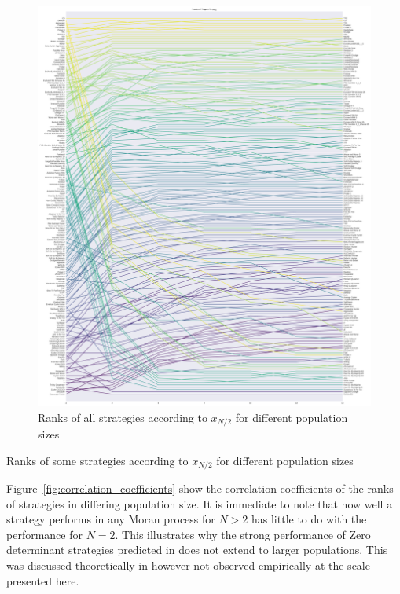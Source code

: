 \documentclass{article}
\begin{document}
\begin{figure}[!hbtp]
    \centering
    \includegraphics[height=.9\textheight]{./img/average_rank_vs_population_size_coexist.pdf}
    \caption{Ranks of all strategies according to \(x_{N/2}\) for different
    population sizes}
    \label{fig:ranks_v_size_coexist}
\end{figure}

\begin{table}[!hbtp]
    \centering
    \scriptsize
    
    \caption{Ranks of some strategies according to \(x_{N/2}\) for different
    population sizes}
    \label{tbl:ranks_v_size_coexist}
\end{table}


Figure~\ref{fig:correlation_coefficients} show the correlation coefficients
of the ranks of strategies in differing population size. It is immediate to
note that how well a strategy performs in any Moran process for \(N>2\) has
little to do with the performance for \(N=2\). This illustrates why the strong
performance of Zero determinant strategies predicted in \cite{Press2012} does
not extend to larger populations. This was discussed theoretically in
\cite{Adami2013} however not observed empirically at the scale presented here.
\end{document}
